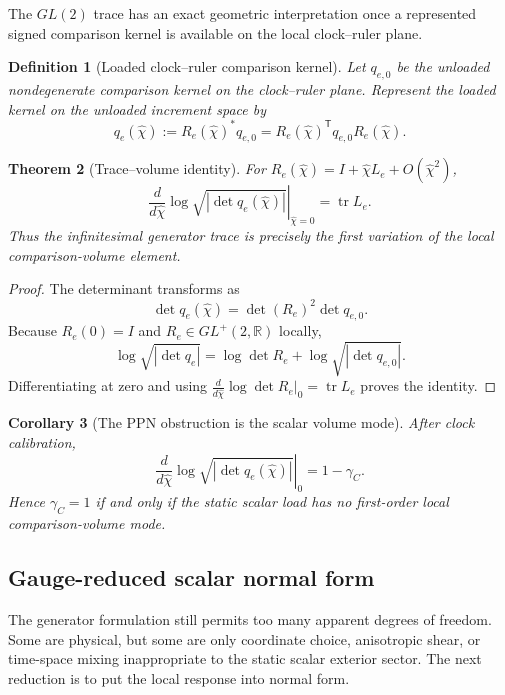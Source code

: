 \documentclass[11pt]{article}
\newtheorem{theorem}{Theorem}[section]
\newtheorem{corollary}[theorem]{Corollary}
\newtheorem{definition}[theorem]{Definition}
\theoremstyle{remark}
\begin{document}
The $GL(2)$ trace has an exact geometric interpretation once a represented signed comparison kernel is available on the local clock--ruler plane.

\begin{definition}[Loaded clock--ruler comparison kernel]
Let $q_{e,0}$ be the unloaded nondegenerate comparison kernel on the clock--ruler plane.  Represent the loaded kernel on the unloaded increment space by
\[
        q_e(\hat\chi):=R_e(\hat\chi)^*q_{e,0}
        =R_e(\hat\chi)^{\mathsf T}q_{e,0}R_e(\hat\chi).
\]
\end{definition}

\begin{theorem}[Trace--volume identity]
\label{thm:trace-volume}
For $R_e(\hat\chi)=I+\hat\chi L_e+O(\hat\chi^2)$,
\[
        \boxed{
        \left.\frac{d}{d\hat\chi}
        \log\sqrt{|\det q_e(\hat\chi)|}
        \right|_{\hat\chi=0}
        =\operatorname{tr}L_e
        }.
\]
Thus the infinitesimal generator trace is precisely the first variation of the local comparison-volume element.
\end{theorem}

\begin{proof}
The determinant transforms as
\[
        \det q_e(\hat\chi)
        =\det(R_e)^2\det q_{e,0}.
\]
Because $R_e(0)=I$ and $R_e\in GL^+(2,\mathbb R)$ locally,
\[
        \log\sqrt{|\det q_e|}
        =\log\det R_e+\log\sqrt{|\det q_{e,0}|}.
\]
Differentiating at zero and using $\frac{d}{d\hat\chi}\log\det R_e|_0=\operatorname{tr}L_e$ proves the identity.
\end{proof}

\begin{corollary}[The PPN obstruction is the scalar volume mode]
\label{cor:ppn-volume-mode}
After clock calibration,
\[
        \left.\frac{d}{d\hat\chi}
        \log\sqrt{|\det q_e(\hat\chi)|}
        \right|_{0}
        =1-\gamma_C.
\]
Hence $\gamma_C=1$ if and only if the static scalar load has no first-order local comparison-volume mode.
\end{corollary}

\subsection{Gauge-reduced scalar normal form}

The generator formulation still permits too many apparent degrees of freedom.  Some are physical, but some are only coordinate choice, anisotropic shear, or time-space mixing inappropriate to the static scalar exterior sector.  The next reduction is to put the local response into normal form.
\end{document}
